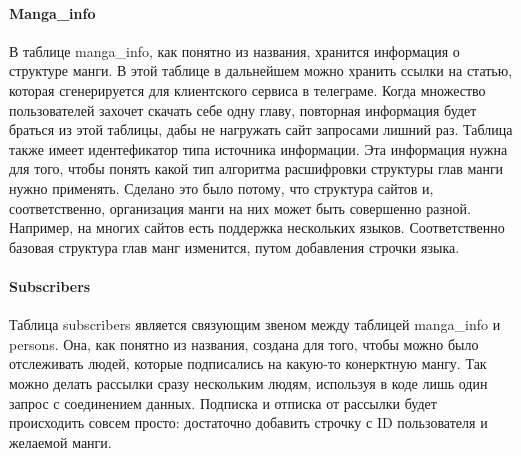 \paragraph{Manga\_info}
В таблице manga\_info, как понятно из названия, хранится информация о структуре манги.
В этой таблице в дальнейшем можно хранить ссылки на статью, которая сгенерируется для клиентского сервиса в телеграме.
Когда множество пользователей захочет скачать себе одну главу, повторная информация будет браться из этой таблицы, дабы не нагружать сайт запросами лишний раз.
Таблица также имеет идентефикатор типа источника информации. Эта информация нужна для того, чтобы понять какой тип алгоритма расшифровки структуры глав манги нужно применять.
Сделано это было потому, что структура сайтов и, соответственно, организация манги на них может быть совершенно разной. Например, на многих сайтов есть поддержка нескольких языков.
Соответственно базовая структура глав манг изменится, путом добавления строчки языка.

\paragraph{Subscribers}
Таблица subscribers является связующим звеном между таблицей manga\_info и persons. 
Она, как понятно из названия, создана для того, чтобы можно было отслеживать людей, которые подписались на какую-то конерктную мангу.
Так можно делать рассылки сразу нескольким людям, используя в коде лишь один запрос с соединением данных.
Подписка и отписка от рассылки будет происходить совсем просто: достаточно добавить строчку с ID пользователя и желаемой манги.